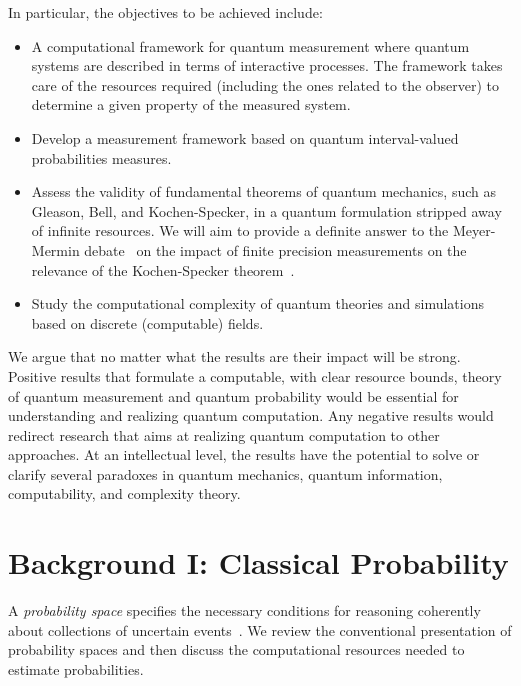 \documentclass{article}
\theoremstyle{remark}
\begin{document}
In particular, the objectives to be achieved include:
\begin{itemize}
\item A computational framework for quantum measurement where quantum
  systems are described in terms of interactive processes. The
  framework takes care of the resources required (including the ones
  related to the observer) to determine a given property of the
  measured system.
\item Develop a measurement framework based on quantum interval-valued
  probabilities measures.
\item Assess the validity of fundamental theorems of quantum
  mechanics, such as Gleason, Bell, and Kochen-Specker, in a quantum
  formulation stripped away of infinite resources. We will aim to
  provide a definite answer to the Meyer-Mermin
  debate~\cite{PhysRevLett.83.3751, Mermin1999, BarrettKent2004} on
  the impact of finite precision measurements on the relevance of the
  Kochen-Specker
  theorem~\cite{kochenspecker1967,Redhead1987-REDINA,peres1995quantum,Jaeger2007}.
\item Study the computational complexity of quantum theories and
  simulations based on discrete (computable) fields.
\end{itemize}
We argue that no matter what the results are their impact will be
strong. Positive results that formulate a computable, with clear
resource bounds, theory of quantum measurement and quantum probability
would be essential for understanding and realizing quantum
computation. Any negative results would redirect research that aims at
realizing quantum computation to other approaches. At an intellectual
level, the results have the potential to solve or clarify several
paradoxes in quantum mechanics, quantum information, computability,
and complexity theory.

\section{Background I: Classical Probability}

A \emph{probability space} specifies the necessary conditions for
reasoning coherently about collections of uncertain
events~\cite{Kolmogorov1950,Shafer1976,Griffiths2003,Swart2013}.  We
review the conventional presentation of probability spaces and then
discuss the computational resources needed to estimate probabilities.

\end{document}
